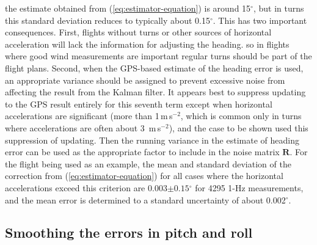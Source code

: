 \documentclass[12pt,twoside,english,12pt,twoside,english]{article}\usepackage[]{graphicx}\usepackage[]{color}
\let\OrgIndex\index
\renewcommand*{\index}[1]{\OrgIndex{#1}}
\begin{document}
the estimate obtained from (\ref{eq:estimator-equation}) is around
15$^{\circ}$, but in turns this standard deviation reduces to typically
about 0.15$^{\circ}$. This has two important consequences. First,
flights without turns or other sources of horizontal acceleration
will lack the information for adjusting the heading. so in flights
where good wind measurements
are important regular turns should
be part of the flight plans. Second, when the GPS-based estimate of
the heading error is used, an appropriate variance
should be assigned to prevent excessive noise from affecting the result
from the Kalman filter. It appears best to suppress updating to the
GPS result entirely for this seventh term except when horizontal accelerations
are significant (more than 1\,m\,s$^{-2}$, which is common only
in turns where accelerations are often about 3~m\,s$^{-2}$), and
the case to be shown used this suppression of updating. Then the running
variance in the estimate of heading error can be used as the appropriate
factor to include in the noise matrix
$\mathbf{R}$\@. For the flight being used as an example, the mean
and standard deviation of
the correction from (\ref{eq:estimator-equation}) for all cases where
the horizontal accelerations exceed this criterion are 0.003$\pm0.15{}^{\circ}$
for 4295 1-Hz measurements, and the mean error
is determined to a standard uncertainty
of about 0.002$^{\circ}$.

\subsection{Smoothing the errors in pitch and roll\label{subsec:Smoothing-the-errors}}
\end{document}
